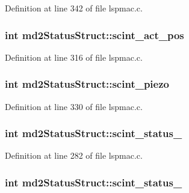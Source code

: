 Definition at line 342 of file lspmac.\-c.

\hypertarget{structmd2StatusStruct_a1c146fc792c4285eed5b2c446c214f98}{
\subsubsection[{scint\-\_\-act\-\_\-pos}]{\setlength{\rightskip}{0pt plus 5cm}int md2\-Status\-Struct\-::scint\-\_\-act\-\_\-pos}}\label{structmd2StatusStruct_a1c146fc792c4285eed5b2c446c214f98}


Definition at line 316 of file lspmac.\-c.

\hypertarget{structmd2StatusStruct_a031be48adfa016c637d6eae49054c435}{
\subsubsection[{scint\-\_\-piezo}]{\setlength{\rightskip}{0pt plus 5cm}int md2\-Status\-Struct\-::scint\-\_\-piezo}}\label{structmd2StatusStruct_a031be48adfa016c637d6eae49054c435}


Definition at line 330 of file lspmac.\-c.

\hypertarget{structmd2StatusStruct_a1723870357f428ac5c2758a2c9a475c7}{
\subsubsection[{scint\-\_\-status\-\_\-1}]{\setlength{\rightskip}{0pt plus 5cm}int md2\-Status\-Struct\-::scint\-\_\-status\-\_}}\label{structmd2StatusStruct_a1723870357f428ac5c2758a2c9a475c7}


Definition at line 282 of file lspmac.\-c.

\hypertarget{structmd2StatusStruct_a4e5bc72e2f4007370f1c29ea272c952f}{
\subsubsection[{scint\-\_\-status\-\_\-2}]{\setlength{\rightskip}{0pt plus 5cm}int md2\-Status\-Struct\-::scint\-\_\-status\-\_}}\label{structmd2StatusStruct_a4e5bc72e2f4007370f1c29ea272c952f}


